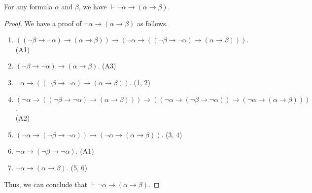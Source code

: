 \begin{theorem}
  \label{thm:contradiction}
  For any formula $\alpha$ and $\beta$, we have
  $\vdash \neg\alpha \to (\alpha \to \beta)$.
\end{theorem}
\begin{proof}
  We have a proof of $\neg\alpha \to (\alpha \to \beta)$ as follows.
  \begin{enumerate}[1.]
    \item $((\neg\beta \to \neg\alpha) \to (\alpha \to \beta))
    \to (\neg\alpha \to ((\neg\beta \to \neg\alpha) \to (\alpha \to \beta)))$.
    \hfill (A1)
    \item $(\neg\beta \to \neg\alpha) \to (\alpha \to \beta)$. \hfill (A3)
    \item $\neg\alpha \to ((\neg\beta \to \neg\alpha) \to (\alpha \to \beta))$.
    \hfill (1, 2)
    \item $(\neg\alpha \to ((\neg\beta \to \neg\alpha) \to (\alpha \to \beta)))
    \to ((\neg\alpha \to (\neg\beta \to \neg\alpha))
    \to (\neg\alpha \to (\alpha \to \beta)))$. \\ \hbox{} \hfill (A2)
    \item $(\neg\alpha \to (\neg\beta \to \neg\alpha))
    \to (\neg\alpha \to (\alpha \to \beta))$. \hfill (3, 4)
    \item $\neg\alpha \to (\neg\beta \to \neg\alpha)$. \hfill (A1)
    \item $\neg\alpha \to (\alpha \to \beta)$. \hfill (5, 6)
  \end{enumerate}
  Thus, we can conclude that $\vdash \neg\alpha \to (\alpha \to \beta)$.
\end{proof}